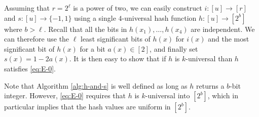 Assuming that $r=2^\ell$ is a power of two, we can easily construct
$i:[u]\to[r]$ and $s:[u]\to\{-1,1\}$ using a single $4$-universal
hash function $h:[u]\to[2^b]$ where $b>\ell$. Recall that all the bits in
$h(x_1),\ldots,h(x_4)$ are independent. We can therefore use the
$\ell$ least significant bits of $h(x)$ for $i(x)$ and the most
significant bit of $h(x)$ for a bit $a(x)\in[2]$, and finally set
$s(x)=1-2a(x)$. It is then easy to show that if $h$ is $k$-universal
than $h$ satisfies \cref{eq:E-0}.
Note that Algorithm \ref{alg:h-and-s} is well defined as long as 
$h$ returns a $b$-bit integer. However, \cref{eq:E-0} requires
that $h$ is $k$-universal into $[2^b]$, which in particular implies that
the hash values are uniform in $[2^b]$.


